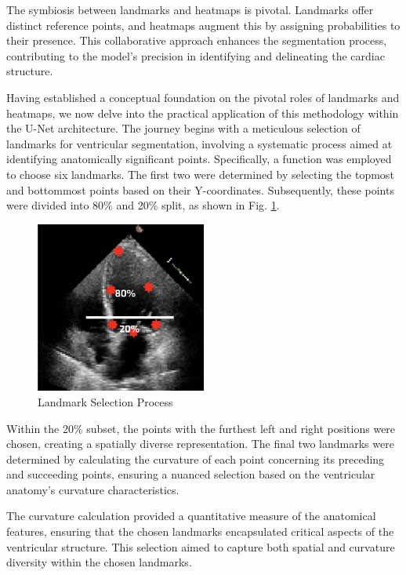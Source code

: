 \documentclass[runningheads]{llncs}
\begin{document}
The symbiosis between landmarks and heatmaps is pivotal. Landmarks offer distinct reference points, and heatmaps augment this by assigning probabilities to their presence. This collaborative approach enhances the segmentation process, contributing to the model's precision in identifying and delineating the cardiac structure.

Having established a conceptual foundation on the pivotal roles of landmarks and heatmaps, we now delve into the practical application of this methodology within the U-Net architecture. The journey begins with a meticulous selection of landmarks for ventricular segmentation, involving a systematic process aimed at identifying anatomically significant points. Specifically, a function was employed to choose six landmarks. The first two were determined by selecting the topmost and bottommost points based on their Y-coordinates. Subsequently, these points were divided into 80\% and 20\% split, as shown in Fig. \ref{fig:sol}.

\begin{figure}[H]
    \centering
    \includegraphics[width=0.5\textwidth]{sol.jpg}
    \caption{Landmark Selection Process}
    \label{fig:sol}
\end{figure}

Within the 20\% subset, the points with the furthest left and right positions were chosen, creating a spatially diverse representation. The final two landmarks were determined by calculating the curvature of each point concerning its preceding and succeeding points, ensuring a nuanced selection based on the ventricular anatomy's curvature characteristics. 

The curvature calculation provided a quantitative measure of the anatomical features, ensuring that the chosen landmarks encapsulated critical aspects of the ventricular structure. This selection aimed to capture both spatial and curvature diversity within the chosen landmarks.
\end{document}
